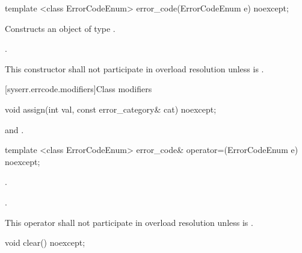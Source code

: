 \begin{itemdecl}
template <class ErrorCodeEnum>
  error_code(ErrorCodeEnum e) noexcept;
\end{itemdecl}

\begin{itemdescr}
\pnum
\effects Constructs an object of type .

\pnum
\postconditions {}.

\pnum
\remarks This constructor shall not participate in overload resolution unless\linebreak
{} is .
\end{itemdescr}

[syserr.errcode.modifiers]{Class  modifiers}

\begin{itemdecl}
void assign(int val, const error_category& cat) noexcept;
\end{itemdecl}

\begin{itemdescr}
\pnum
\postconditions {} and .
\end{itemdescr}

\begin{itemdecl}
template <class ErrorCodeEnum>
    error_code& operator=(ErrorCodeEnum e) noexcept;
\end{itemdecl}

\begin{itemdescr}
\pnum
\postconditions {}.

\pnum
\returns {}.

\pnum
\remarks This operator shall not participate in overload resolution unless\linebreak
{} is .
\end{itemdescr}

\begin{itemdecl}
void clear() noexcept;
\end{itemdecl}

